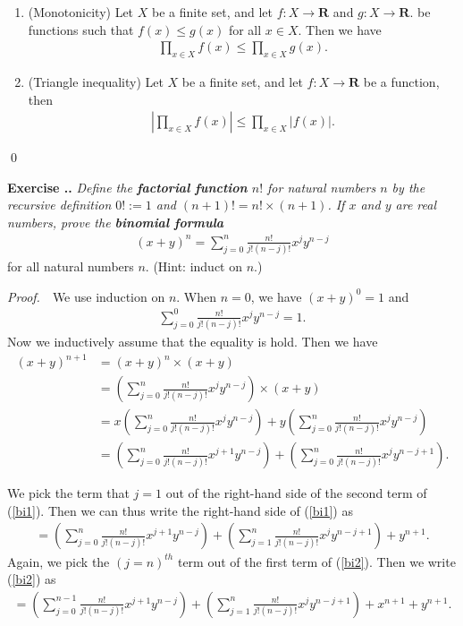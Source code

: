 \documentclass{book}
\newcommand{\pff}{\vspace{.25em}\noindent\emph{Proof.}~~}
\newcounter{Exercise}[section]
\renewcommand{\theExercise}{\thesection.\arabic{Exercise}.}
\newcommand{\new}{\vspace{1.5em}\noindent\textbf{{Exercise \stepcounter{Exercise}\textbf{\theExercise}}} }
\begin{document}
\begin{framed}
\begin{enumerate}
    \item (Monotonicity) Let $X$ be a finite set, and let $f:X\to\mathbf{R}$ and $g:X\to\mathbf{R}$. be functions such that $f(x)\leq g(x)$ for all $x\in X$. Then we have
    \begin{align*}
        \prod_{x\in X}f(x)\leq\prod_{x\in X}g(x).
    \end{align*}

    \item (Triangle inequality) Let $X$ be a finite set, and let $f:X\to\mathbf{R}$ be a function, then
    \begin{align*}
        \left|\prod_{x\in X}f(x)\right|\leq\prod_{x\in X}|f(x)|.
    \end{align*}
\end{enumerate}
\end{framed}\qed

\new\emph{Define the \textbf{factorial function} $n!$ for natural numbers $n$ by the recursive definition $0!:=1$ and $(n+1)!=n!\times(n+1)$. If $x$ and $y$ are real numbers, prove the \textbf{binomial formula}}
    \begin{align*}
        (x+y)^n=\sum_{j=0}^n\frac{n!}{j!(n-j)!}x^jy^{n-j}
    \end{align*}
for all natural numbers $n$. (Hint: induct on $n$.)

\pff We use induction on $n$. When $n=0$, we have $(x+y)^0=1$ and
    \begin{align*}
        \sum_{j=0}^0\frac{n!}{j!(n-j)!}x^jy^{n-j}=1.
    \end{align*}
Now we inductively assume that the equality is hold. Then we have
    \begin{align}\label{bi1}
        (x+y)^{n+1}
        &=(x+y)^n\times(x+y)\nonumber\\
        &=\left(\sum_{j=0}^n\frac{n!}{j!(n-j)!}x^jy^{n-j}\right)\times(x+y)\nonumber\\
        &=x\left(\sum_{j=0}^n\frac{n!}{j!(n-j)!}x^jy^{n-j}\right)+y\left(\sum_{j=0}^n\frac{n!}{j!(n-j)!}x^jy^{n-j}\right)\nonumber\\
        &=\left(\sum_{j=0}^n\frac{n!}{j!(n-j)!}x^{j+1}y^{n-j}\right)+\left(\sum_{j=0}^n\frac{n!}{j!(n-j)!}x^jy^{n-j+1}\right).
    \end{align}

We pick the term that $j=1$ out of the right-hand side of the second term of (\ref{bi1}). Then we can thus write the right-hand side of (\ref{bi1}) as
    \begin{align}\label{bi2}
        =\left(\sum_{j=0}^n\frac{n!}{j!(n-j)!}x^{j+1}y^{n-j}\right)+\left(\sum_{j=1}^n\frac{n!}{j!(n-j)!}x^jy^{n-j+1}\right)+y^{n+1}.
    \end{align}
Again, we pick the $(j=n)^{th}$ term out of the first term of (\ref{bi2}). Then we write (\ref{bi2}) as
    \begin{align}\label{bi3}
        =\left(\sum_{j=0}^{n-1}\frac{n!}{j!(n-j)!}x^{j+1}y^{n-j}\right)+\left(\sum_{j=1}^n\frac{n!}{j!(n-j)!}x^jy^{n-j+1}\right)+x^{n+1}+y^{n+1}.
    \end{align}
\end{document}
